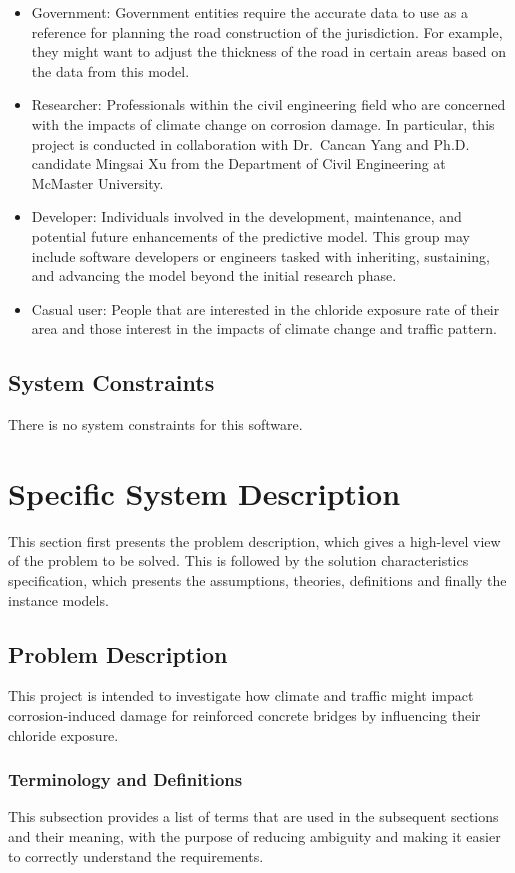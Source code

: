 \documentclass[12pt]{article}
\begin{document}
\begin{itemize}
\item Government: Government entities require the accurate data to use as a reference for planning the road construction of the jurisdiction. For example, they might want to adjust the thickness of the road in certain areas based on the data from this model.
\item Researcher: Professionals within the civil engineering field who are concerned with the impacts of climate change on corrosion damage. In particular, this project is conducted in collaboration with Dr.\ Cancan Yang and Ph.D. candidate Mingsai Xu from the Department of Civil Engineering at McMaster University.
\item Developer: Individuals involved in the development, maintenance, and potential future enhancements of the predictive model. This group may include software developers or engineers tasked with inheriting, sustaining, and advancing the model beyond the initial research phase.
\item Casual user: People that are interested in the chloride exposure rate of their area and those interest in the impacts of climate change and traffic pattern. 
\end{itemize}


\subsection{System Constraints}
There is no system constraints for this software.
  
\section{Specific System Description}

This section first presents the problem description, which gives a high-level
view of the problem to be solved.  This is followed by the solution characteristics
specification, which presents the assumptions, theories, definitions and finally
the instance models.  

\subsection{Problem Description} \label{Sec_pd}
This project is intended to investigate how climate and traffic might impact corrosion-induced damage for reinforced concrete bridges by influencing their chloride exposure.

\subsubsection{Terminology and  Definitions}
This subsection provides a list of terms that are used in the subsequent
sections and their meaning, with the purpose of reducing ambiguity and making it
easier to correctly understand the requirements.
\end{document}
